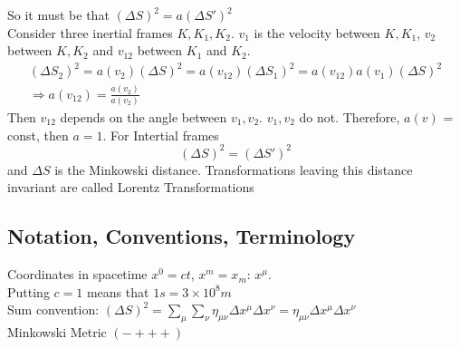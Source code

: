 \documentclass[]{scrartcl}
\begin{document}
So it must be that $(\Delta S)^2 = a(\Delta S')^2$\\
Consider three inertial frames $K, K_1, K_2$. $v_1$ is the velocity between $K,K_1$, $v_2$ between $K, K_2$ and $v_{12}$ between $K_1$ and $K_2$.
\begin{gather}
	(\Delta S_2)^2 = a(v_2) (\Delta S)^2 = a(v_{12}) (\Delta S_{1})^2 = a(v_{12})a(v_1)(\Delta S)^2\\
	\Rightarrow a(v_{12}) = \frac{a(v_2)}{a(v_2)}
\end{gather}
Then $v_{12}$ depends on the angle between $v_1,v_2$. $v_1,v_2$ do not. Therefore, $a(v)$ = const, then $a= 1$. For Intertial frames
\begin{equation}
	(\Delta S)^2 = (\Delta S')^2
\end{equation}
and $\Delta S$ is the Minkowski distance. Transformations leaving this distance invariant are called Lorentz Transformations

\subsection{Notation, Conventions, Terminology}
Coordinates in spacetime $x^0 = ct$, $x^m = x_m$: $x^\mu$.\\
Putting $c=1$ means that $1s = 3\times 10^8 m$\\
Sum convention: $(\Delta S)^2 = \sum_\mu \sum_\nu \eta_{\mu\nu} \Delta x^\mu \Delta x^\nu = \eta_{\mu\nu} \Delta x^\mu \Delta x^\nu$\\
Minkowski Metric $(-+++)$\\
\end{document}
